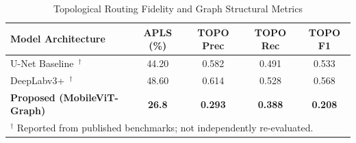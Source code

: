 \documentclass[conference]{IEEEtran}
\begin{document}
\begin{table}[t]
\centering
\caption{Quantitative Performance Benchmarks on Held-Out Rural Test Dataset}
\label{tab:pixel_metrics}
\end{table}

\begin{table}[t]
\centering
\caption{Topological Routing Fidelity and Graph Structural Metrics}
\label{tab:topo_metrics}
\begin{tabular}{lcccc}
\toprule
\textbf{Model Architecture} & \textbf{APLS (\%)} & \textbf{TOPO Prec} & \textbf{TOPO Rec} & \textbf{TOPO F1} \\
\midrule
U-Net Baseline~\cite{ronneberger2015unet}$^\dagger$ & 44.20 & 0.582 & 0.491 & 0.533 \\
DeepLabv3+~\cite{chen2017deeplab}$^\dagger$ & 48.60 & 0.614 & 0.528 & 0.568 \\
\textbf{Proposed (MobileViT-Graph)} & \textbf{26.8} & \textbf{0.293} & \textbf{0.388} & \textbf{0.208} \\
\bottomrule
\multicolumn{5}{l}{$^\dagger$ Reported from published benchmarks; not independently re-evaluated.}
\end{tabular}
\end{table}
\end{document}
